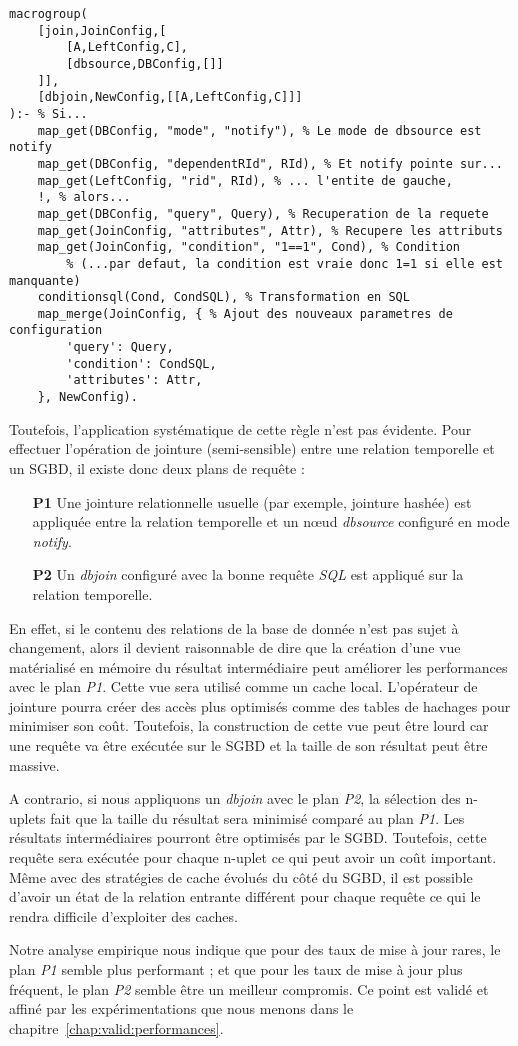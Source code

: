 \begin{lstlisting}
macrogroup(
    [join,JoinConfig,[
        [A,LeftConfig,C],
        [dbsource,DBConfig,[]]
    ]],
    [dbjoin,NewConfig,[[A,LeftConfig,C]]]
):- % Si...
    map_get(DBConfig, "mode", "notify"), % Le mode de dbsource est notify
    map_get(DBConfig, "dependentRId", RId), % Et notify pointe sur...
    map_get(LeftConfig, "rid", RId), % ... l'entite de gauche,
    !, % alors...
    map_get(DBConfig, "query", Query), % Recuperation de la requete
    map_get(JoinConfig, "attributes", Attr), % Recupere les attributs
    map_get(JoinConfig, "condition", "1==1", Cond), % Condition
        % (...par defaut, la condition est vraie donc 1=1 si elle est manquante)
    conditionsql(Cond, CondSQL), % Transformation en SQL
    map_merge(JoinConfig, { % Ajout des nouveaux parametres de configuration
        'query': Query,
        'condition': CondSQL, 
        'attributes': Attr,
    }, NewConfig).
\end{lstlisting}

Toutefois, l'application systématique de cette règle n'est pas évidente. Pour effectuer l'opération de jointure (semi-sensible) entre une relation temporelle et un SGBD, il existe donc deux plans de requête :
\begin{itemize}
    \item[\textbf{P1}] Une jointure relationnelle usuelle (par exemple, jointure hashée) est appliquée entre la relation temporelle et un nœud \textit{dbsource} configuré en mode \textit{notify}.
    \item[\textbf{P2}] Un \textit{dbjoin} configuré avec la bonne requête \textit{SQL} est appliqué sur la relation temporelle.
\end{itemize}

En effet, si le contenu des relations de la base de donnée n'est pas sujet à changement, alors il devient raisonnable de dire que la création d'une vue matérialisé en mémoire du résultat intermédiaire peut améliorer les performances avec le plan \textit{P1}. Cette vue sera utilisé comme un cache local. L'opérateur de jointure pourra créer des accès plus optimisés comme des tables de hachages pour minimiser son coût. Toutefois, la construction de cette vue peut être lourd car une requête va être exécutée sur le SGBD et la taille de son résultat peut être massive.

A contrario, si nous appliquons un \textit{dbjoin} avec le plan \textit{P2}, la sélection des n-uplets fait que la taille du résultat sera minimisé comparé au plan \textit{P1}. Les résultats intermédiaires pourront être optimisés par le SGBD. Toutefois, cette requête sera exécutée pour chaque n-uplet ce qui peut avoir un coût important. Même avec des stratégies de cache évolués du côté du SGBD, il est possible d'avoir un état de la relation entrante différent pour chaque requête ce qui le rendra difficile d'exploiter des caches.

Notre analyse empirique nous indique que pour des taux de mise à jour rares, le plan \textit{P1} semble plus performant ; et que pour les taux de mise à jour plus fréquent, le plan \textit{P2} semble être un meilleur compromis. Ce point est validé et affiné par les expérimentations que nous menons dans le chapitre~\ref{chap:valid:performances}.
